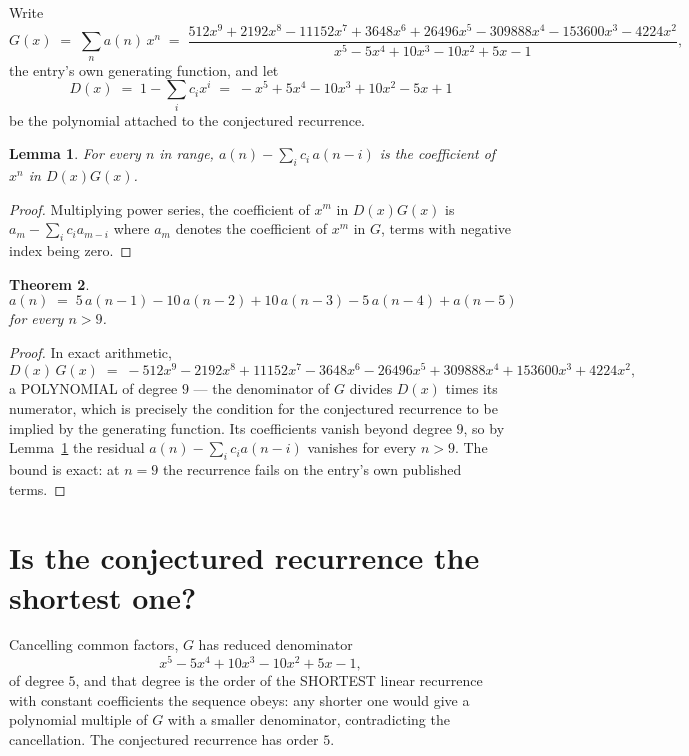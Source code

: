 \documentclass[11pt,a4paper]{article}
\theoremstyle{plain}
\newtheorem{theorem}{Theorem}
\newtheorem{lemma}[theorem]{Lemma}
\theoremstyle{definition}
\begin{document}
Write
\[
G(x)\;=\;\sum_{n}a(n)\,x^{n}\;=\;\frac{512 x^{9} + 2192 x^{8} - 11152 x^{7} + 3648 x^{6} + 26496 x^{5} - 309888 x^{4} - 153600 x^{3} - 4224 x^{2}}{x^{5} - 5 x^{4} + 10 x^{3} - 10 x^{2} + 5 x - 1},
\]
the entry's own generating function, and let
\[
D(x)\;=\;1-\sum_i c_i x^{i}\;=\;- x^{5} + 5 x^{4} - 10 x^{3} + 10 x^{2} - 5 x + 1
\]
be the polynomial attached to the conjectured recurrence.

\begin{lemma}\label{lem:key}
For every $n$ in range, $a(n)-\sum_i c_i\,a(n-i)$ is the coefficient of $x^{n}$ in
$D(x)G(x)$.
\end{lemma}

\begin{proof}
Multiplying power series, the coefficient of $x^{m}$ in $D(x)G(x)$ is
$a_m-\sum_i c_i a_{m-i}$ where $a_m$ denotes the coefficient of $x^{m}$ in $G$, terms with
negative index being zero.
\end{proof}

\begin{theorem}
\[
a(n)\;=\;5\,a(n-1) - 10\,a(n-2) + 10\,a(n-3) - 5\,a(n-4) + a(n-5)
\]
for every $n>9$.
\end{theorem}

\begin{proof}
In exact arithmetic,
\[
D(x)\,G(x)\;=\;- 512 x^{9} - 2192 x^{8} + 11152 x^{7} - 3648 x^{6} - 26496 x^{5} + 309888 x^{4} + 153600 x^{3} + 4224 x^{2},
\]
a POLYNOMIAL of degree $9$ --- the denominator of $G$ divides $D(x)$ times its numerator,
which is precisely the condition for the conjectured recurrence to be implied by the
generating function. Its coefficients vanish beyond degree $9$, so by
Lemma~\ref{lem:key} the residual $a(n)-\sum_ic_ia(n-i)$ vanishes for every
$n>9$. The bound is exact: at $n=9$ the recurrence fails on the entry's own published terms.
\end{proof}

\section{Is the conjectured recurrence the shortest one?}

Cancelling common factors, $G$ has reduced denominator
\[
x^{5} - 5 x^{4} + 10 x^{3} - 10 x^{2} + 5 x - 1,
\]
of degree $5$, and that degree is the order of the SHORTEST linear recurrence with
constant coefficients the sequence obeys: any shorter one would give a polynomial multiple of
$G$ with a smaller denominator, contradicting the cancellation. The conjectured recurrence has
order $5$.
\end{document}
